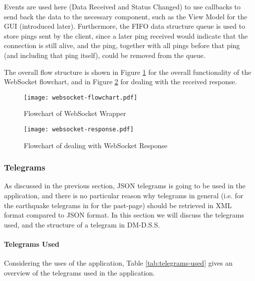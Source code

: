 Events are used here (Data Received and Status Changed) to use callbacks to send back the data to the necessary component, such as the View Model for the GUI (introduced later). Furthermore, the FIFO data structure queue is used to store pings sent by the client, since a later ping received would indicate that the connection is still alive, and the ping, together with all pings before that ping (and including that ping itself), could be removed from the queue.

The overall flow structure is shown in Figure \ref{fig:websocket-flowchart} for the overall functionality of the WebSocket flowchart, and in Figure \ref{fig:websocket-response} for dealing with the received response.

\begin{figure}
    \centering
    \texttt{[image: websocket-flowchart.pdf]}
    \caption{Flowchart of WebSocket Wrapper}
    \label{fig:websocket-flowchart}
\end{figure}

\begin{figure}
    \centering
    \texttt{[image: websocket-response.pdf]}
    \caption{Flowchart of dealing with WebSocket Response}
    \label{fig:websocket-response}
\end{figure}

\subsubsection{Telegrams}

As discussed in the previous section, JSON telegrams is going to be used in the application, and there is no particular reason why telegrams in general (i.e. for the earthquake telegrams in  for the past-page) should be retrieved in XML format compared to JSON format. In this section we will discuss the telegrams used, and the structure of a telegram in DM-D.S.S.

\paragraph{Telegrams Used}

Considering the uses of the application, Table \ref{tab:telegrams-used} gives an overview of the telegrams used in the application.

